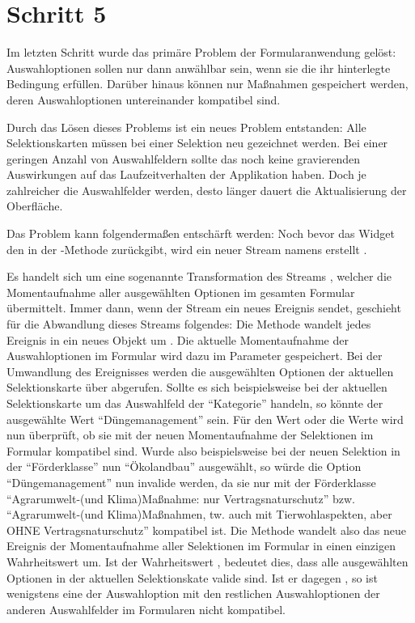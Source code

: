 \chapter{Schritt 5}
\label{chap:Schritt-5}

Im letzten Schritt wurde das primäre Problem der Formularanwendung gelöst:
Auswahloptionen sollen nur dann anwählbar sein,
wenn sie die ihr hinterlegte Bedingung erfüllen.
Darüber hinaus können nur Maßnahmen gespeichert werden,
deren Auswahloptionen untereinander kompatibel sind.

Durch das Lösen dieses Problems ist ein neues Problem entstanden:
Alle Selektionskarten müssen bei einer Selektion neu gezeichnet werden.
Bei einer geringen Anzahl von Auswahlfeldern sollte das noch keine gravierenden Auswirkungen auf das Laufzeitverhalten der Applikation haben.
Doch je zahlreicher die Auswahlfelder werden,
desto länger dauert die Aktualisierung der Oberfläche.

Das Problem kann folgendermaßen entschärft werden:
Noch bevor das Widget  den  in der -Methode zurückgibt,
wird ein neuer Stream namens  erstellt .

Es handelt sich um eine sogenannte Transformation des Streams , welcher die Momentaufnahme aller ausgewählten Optionen im gesamten Formular übermittelt.
Immer dann, wenn der Stream  ein neues Ereignis sendet,
geschieht für die Abwandlung dieses Streams folgendes:
Die Methode  wandelt jedes Ereignis in ein neues Objekt um .
Die aktuelle Momentaufnahme der Auswahloptionen im Formular wird dazu im Parameter  gespeichert.
Bei der Umwandlung des Ereignisses werden die ausgewählten Optionen der aktuellen Selektionskarte über  abgerufen.
Sollte es sich beispielsweise bei der aktuellen Selektionskarte um das Auswahlfeld der \enquote{Kategorie} handeln,
so könnte der ausgewählte Wert \enquote{Düngemanagement} sein.
Für den Wert oder die Werte wird nun überprüft, ob sie mit der neuen Momentaufnahme der Selektionen im Formular kompatibel sind.
Wurde also beispielsweise bei der neuen Selektion in der \enquote{Förderklasse} nun \enquote{Ökolandbau} ausgewählt,
so würde die Option \enquote{Düngemanagement} nun invalide werden,
da sie nur mit der Förderklasse \enquote{Agrarumwelt-(und Klima)Maßnahme: nur Vertragsnaturschutz} bzw. \enquote{Agrarumwelt-(und Klima)Maßnahmen, tw. auch mit Tierwohlaspekten, aber OHNE Vertragsnaturschutz} kompatibel ist.
Die Methode  wandelt also das neue Ereignis der Momentaufnahme aller Selektionen im Formular in einen einzigen Wahrheitswert um.
Ist der Wahrheitswert ,
bedeutet dies,
dass alle ausgewählten Optionen in der aktuellen Selektionskate valide sind.
Ist er dagegen , so ist wenigstens eine der Auswahloption mit den restlichen Auswahloptionen der anderen Auswahlfelder im Formularen nicht kompatibel.

